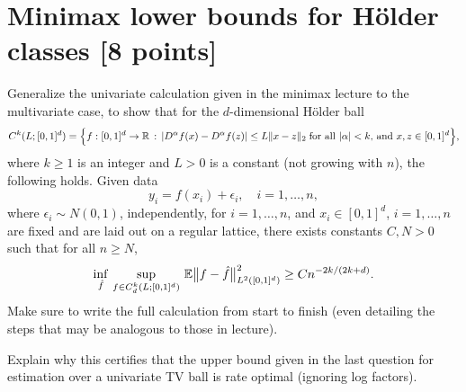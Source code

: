 \documentclass{article}
\begin{document}
\section{Minimax lower bounds for H{\"o}lder classes [8 points]} 

Generalize the univariate calculation given in the minimax lecture to the
multivariate case, to show that for the $d$-dimensional H{\"o}lder ball 
\[
C^k(L; [0,1]^d) = \Big\{ f : [0,1]^d \to \mathbb{R} \,:\, | D^\alpha f (x) - D^\alpha
f(z) | \leq L \|x-z\|_2 \; \text{for all $|\alpha| < k$, and $x,z \in [0,1]^d$}
\Big\},  
\]
where $k \geq 1$ is an integer and $L>0$ is a constant (not growing with $n$),
the following holds. Given data  
\[
y_i = f(x_i) + \epsilon_i, \quad i=1,\dots,n,
\]
where $\epsilon_i \sim N(0,1)$, independently, for $i=1,\dots,n$, and $x_i \in
[0,1]^d$, $i=1,\dots,n$ are fixed and are laid out on a regular lattice, there
exists constants $C,N>0$ such that for all $n \geq N$, 
\[
\inf_{\hat{f}} \, \sup_{f \in C^k_d(L; [0,1]^d)} \, \mathbb{E} \big \|f - \hat{f}
\big\|_{L^2([0,1]^d)}^2 \geq C n^{-2k/(2k+d)}. 
\]
Make sure to write the full calculation from start to finish (even detailing the 
steps that may be analogous to those in lecture). 
\marginpar{\small [7 pts]}

Explain why this certifies that the upper bound given in the last question for
estimation over a univariate TV ball is rate optimal (ignoring log factors). 
\marginpar{\small [1 pt]}



\end{document}

